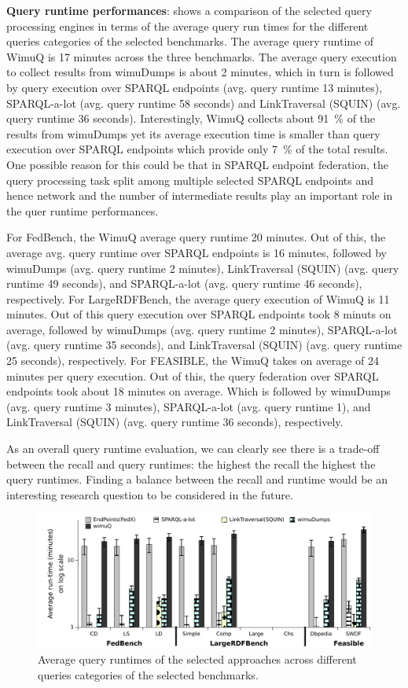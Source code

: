 \documentclass[sw]{iosart2x}
\begin{document}
\textbf{Query runtime performances}: 
 shows a comparison of the selected query processing engines in terms of the average query run times for the different queries categories of the selected benchmarks. The average query runtime of WimuQ is 17 minutes across the three benchmarks. The average query execution to collect results from wimuDumps is about 2 minutes, which in turn is followed by query execution over SPARQL endpoints (avg. query runtime 13 minutes), SPARQL-a-lot (avg. query runtime 58 seconds) and LinkTraversal (SQUIN) (avg. query runtime 36 seconds). Interestingly, WimuQ collects about \SI{91}{\percent} of the results from wimuDumps yet its average execution time is smaller than query execution over SPARQL endpoints which provide only \SI{7}{\percent}  of the total results. One possible reason for this could be that in SPARQL endpoint federation, the query processing task split among multiple selected SPARQL endpoints and hence network and the number of intermediate results play an important role in the quer runtime performances. 

For FedBench, the WimuQ average query runtime 20 minutes. Out of this, the average avg. query runtime over SPARQL endpoints is 16 minutes, followed by wimuDumps (avg. query runtime 2 minutes), LinkTraversal (SQUIN) (avg. query runtime 49 seconds), and SPARQL-a-lot (avg. query runtime 46 seconds), respectively. For LargeRDFBench, the average query execution of WimuQ is 11 minutes. Out of this query execution over SPARQL endpoints took 8 minuts on average, followed by wimuDumps (avg. query runtime 2 minutes), SPARQL-a-lot (avg. query runtime 35 seconds), and LinkTraversal (SQUIN) (avg. query runtime 25 seconds), respectively. For FEASIBLE, the WimuQ takes on average of 24 minutes per query execution. Out of this, the query federation over SPARQL endpoints took about 18 minutes on average. Which is followed by wimuDumps (avg. query runtime 3 minutes), SPARQL-a-lot (avg. query runtime 1), and LinkTraversal (SQUIN) (avg. query runtime 36 seconds), respectively.

As an overall query runtime evaluation, we can clearly see there is a trade-off between the recall and query runtimes: the highest the recall the highest the query runtimes. Finding a balance between the recall and runtime would be an interesting research question to be considered in the future.  

\begin{figure}[htb]
    \includegraphics[width=\textwidth]{img/runtime1Min.pdf}
	\caption{Average query runtimes of the selected approaches across different queries categories of the selected benchmarks.}
	\label{fig:runtime1}
\end{figure}
\end{document}
